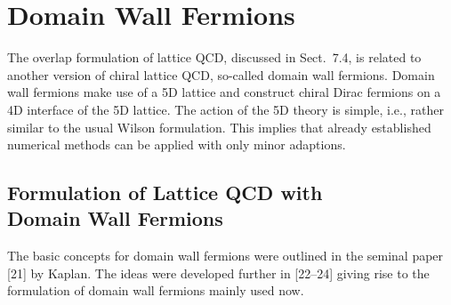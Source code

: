 \section{Domain Wall Fermions}

The overlap formulation of lattice QCD, discussed in Sect.~7.4, is related to
another version of chiral lattice QCD, so-called domain wall fermions. Domain
wall fermions make use of a 5D lattice and construct chiral Dirac fermions on
a 4D interface of the 5D lattice. The action of the 5D theory is simple,
i.e., rather similar to the usual Wilson formulation. This implies that
already established numerical methods can be applied with only minor
adaptions.

\subsection[Formulation of Lattice QCD with Domain Wall Fermions]{Formulation of Lattice QCD with\\ Domain Wall Fermions}

The basic concepts for domain wall fermions were outlined in the seminal paper
[21] by Kaplan. The ideas were developed further in [22--24] giving rise to
the formulation of domain wall fermions mainly used now.

